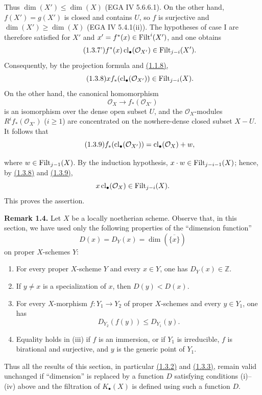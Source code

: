 Thus $\dim(X')\leq\dim(X)$ (EGA IV 5.6.6.1). On the other hand,
$f(X')=g(X')$ is closed and contains $U$, so $f$ is surjective and
$\dim(X')\geq\dim(X)$ (EGA IV 5.4.1(ii)). The hypotheses of case I are
therefore satisfied for $X'$ and $x'=f^*(x)\in\operatorname{Filt}^i(X')$, and one obtains
\begin{equation}\tag{1.3.7'}
f^*(x)\operatorname{cl}_\bullet(\mathcal O_{X'})\in\operatorname{Filt}_{j-i}(X').
\end{equation}
Consequently, by the projection formula and \hyperlink{sga6.e10.prop.1-1-8}{(1.1.8)},
\begin{equation}\tag{1.3.8}
x f_*(\operatorname{cl}_\bullet(\mathcal O_{X'}))\in\operatorname{Filt}_{j-i}(X).
\end{equation}
On the other hand, the canonical homomorphism
\[
\mathcal O_X\longrightarrow f_*(\mathcal O_{X'})
\]
is an isomorphism over the dense open subset $U$, and the
$\mathcal O_X$-modules $R^if_*(\mathcal O_{X'})$ ($i\geq1$) are concentrated
on the nowhere-dense closed subset $X-U$. It follows that
\begin{equation}\tag{1.3.9}
f_*(\operatorname{cl}_\bullet(\mathcal O_{X'}))=\operatorname{cl}_\bullet(\mathcal O_X)+w,
\end{equation}

where $w\in\operatorname{Filt}_{j-1}(X)$. By the induction hypothesis,
$x\cdot w\in\operatorname{Filt}_{j-i-1}(X)$; hence, by \hyperlink{sga6.e10.eq.1-3-8}{(1.3.8)} and \hyperlink{sga6.e10.eq.1-3-9}{(1.3.9)},
\[
x\operatorname{cl}_\bullet(\mathcal O_X)\in\operatorname{Filt}_{j-i}(X).
\]
This proves the assertion.

\textbf{Remark 1.4.}
Let $X$ be a locally noetherian scheme. Observe that, in this section, we
have used only the following properties of the ``dimension function''
\[
D(x)=D_Y(x)=\dim(\overline{\{x\}})
\]
on proper $X$-schemes $Y$:
\begin{enumerate}[label=(\roman*)]
\item For every proper $X$-scheme $Y$ and every $x\in Y$, one has
  $D_Y(x)\in\mathbb Z$.
\item If $y\ne x$ is a specialization of $x$, then $D(y)<D(x)$.
\item For every $X$-morphism $f:Y_1\to Y_2$ of proper $X$-schemes and every
  $y\in Y_1$, one has
  \[
  D_{Y_2}(f(y))\leq D_{Y_1}(y).
  \]
\item Equality holds in (iii) if $f$ is an immersion, or if $Y_1$ is
  irreducible, $f$ is birational and surjective, and $y$ is the generic point
  of $Y_1$.
\end{enumerate}
Thus all the results of this section, in particular \hyperlink{sga6.e10.thm.1-3-2}{(1.3.2)} and \hyperlink{sga6.e10.cor.1-3-3}{(1.3.3)},
remain valid unchanged if ``dimension'' is replaced by a function $D$
satisfying conditions (i)--(iv) above and the filtration of $K_\bullet(X)$ is
defined using such a function $D$.

